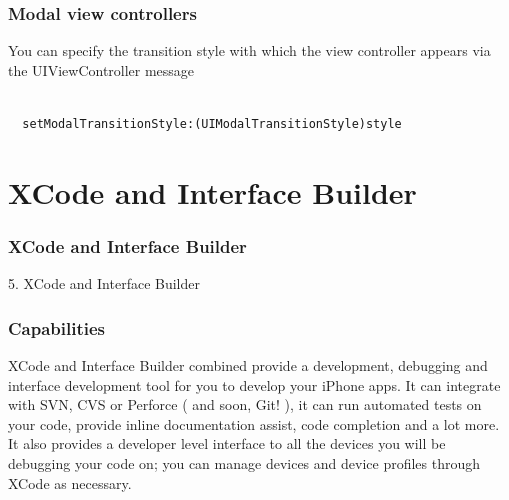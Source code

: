 \documentclass[10pt]{beamer}
\begin{document}
\begin{frame}[fragile]
  \frametitle{Modal view controllers}
  You can specify the transition style with which the view controller appears via the UIViewController message \begin{verbatim}

  setModalTransitionStyle:(UIModalTransitionStyle)style

  \end{verbatim} 

\end{frame}

    

   
  

  
    
\section{XCode and Interface Builder}
\begin{frame}[fragile]
  \frametitle{XCode and Interface Builder}
  5. XCode and Interface Builder
\end{frame}


    
\begin{frame}[fragile]
  \frametitle{Capabilities}
  XCode and Interface Builder combined provide a development, debugging and interface development tool for you to develop your iPhone apps.  It can integrate with SVN, CVS or Perforce ( and soon, Git! ), it can run automated tests on your code, provide inline documentation assist, code completion and a lot more. It also provides a developer level interface to all the devices you will be debugging your code on; you can manage devices and device profiles through XCode as necessary.

\end{frame}
\end{document}
